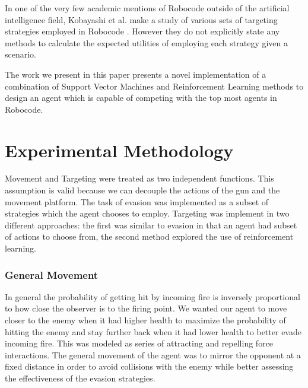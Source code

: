 \documentclass{article}
\theoremstyle{plain}
\theoremstyle{definition}
\theoremstyle{remark}
\begin{document}
In one of the very few academic mentions of Robocode outside of the artificial intelligence field, Kobayashi et al. make a study of various sets of targeting strategies employed in Robocode \cite{strategies}. However they do not explicitly state any methods to calculate the expected utilities of employing each strategy given a scenario.


The work we present in this paper presents a novel implementation of a combination of Support Vector Machines and Reinforcement Learning methods to design an agent which is capable of competing with the top most agents in Robocode.

\section{Experimental Methodology}
Movement and Targeting were treated as two independent functions. This assumption is valid because we can decouple the actions of the gun and the movement platform. The task of evasion was implemented as a subset of strategies which the agent chooses to employ. Targeting was implement in two different approaches: the first was similar to evasion in that an agent had subset of actions to choose from, the second method explored the use of reinforcement learning.

\subsubsection*{General Movement}

In general the probability of getting hit by incoming fire is inversely proportional to how close the observer is to the firing point. We wanted our agent to move closer to the enemy when it had higher health to maximize the probability of hitting the enemy and stay further back when it had lower health to better evade incoming fire. This was modeled as series of attracting and repelling force interactions. The general movement of the agent was to mirror the opponent at a fixed distance in order to avoid collisions with the enemy while better assessing the effectiveness of the evasion strategies. 
\end{document}
